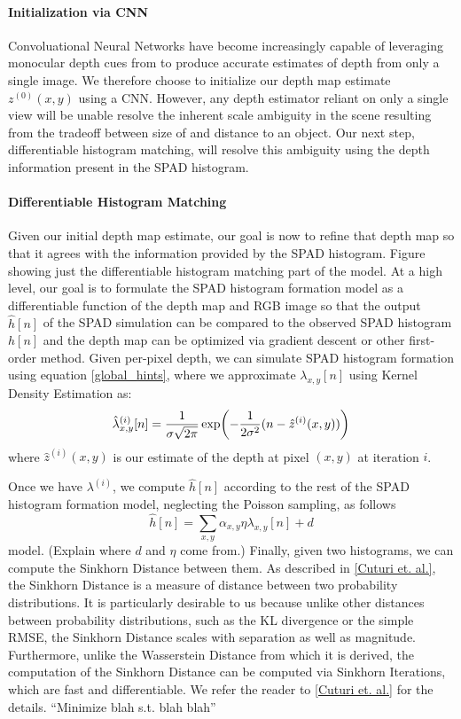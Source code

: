 \paragraph{Initialization via CNN}
Convoluational Neural Networks have become increasingly capable of leveraging
monocular depth cues from to produce accurate estimates of depth
from only a single image. We therefore choose to initialize our depth map
estimate $z^{(0)}(x,y)$ using
a CNN. However, any depth estimator reliant on only a single
view will be unable resolve the inherent scale ambiguity in the scene resulting
from the tradeoff between size of and distance to an object. Our next step,
differentiable histogram matching, will resolve this ambiguity using the depth
information present in the SPAD histogram.

\paragraph{Differentiable Histogram Matching}
Given our initial depth map estimate, our goal is now to refine that depth map
so that it agrees with the information provided by the SPAD histogram.
Figure showing just the differentiable histogram matching part of the model.
At a high level, our goal is to formulate the SPAD histogram formation model as
a differentiable function of the depth map and RGB image so that the output
$\hat h[n]$ of the SPAD simulation can be compared to the observed SPAD
histogram $h[n]$ and the depth map can be optimized via gradient descent or
other first-order method.
Given per-pixel depth, we can simulate SPAD histogram formation using equation
\ref{global_hints}, where we approximate $\lambda_{x,y}[n]$ using Kernel Density
Estimation as:
\begin{equation}
  \hat \lambda^{(i)}_{x,y}[n] = \frac{1}{\sigma\sqrt{2 \pi}}\exp\paren*{-\frac{1}{2\sigma^2}(n - \hat z^{(i)}(x,y))} \label{KDE}
\end{equation}
where $\hat z^{(i)}(x, y)$ is our estimate of the depth at pixel $(x,y)$ at
iteration $i$.

Once we have $\lambda^{(i)}$, we compute $\hat h[n]$ according to the rest of
the SPAD histogram formation model, neglecting the Poisson sampling, as follows
\begin{equation}
  \hat h[n] = \sum_{x,y}\alpha_{x,y}\eta \lambda_{x,y}[n] + d \label{diff_forward}
\end{equation}
model. (Explain where $d$ and $\eta$ come from.)
Finally, given two histograms, we can compute the Sinkhorn Distance between
them. As described in \ref{Cuturi et. al.}, the Sinkhorn Distance is a measure
of distance between two probability distributions. It is particularly desirable
to us because unlike other distances between probability distributions, such as
the KL divergence or the simple RMSE, the Sinkhorn Distance scales with
separation as well as magnitude. Furthermore, unlike the Wasserstein Distance
from which it is derived, the computation of the Sinkhorn Distance can be
computed via Sinkhorn Iterations, which are fast and differentiable.
We refer the reader to \ref{Cuturi et. al.} for the details.
``Minimize blah s.t. blah blah''
